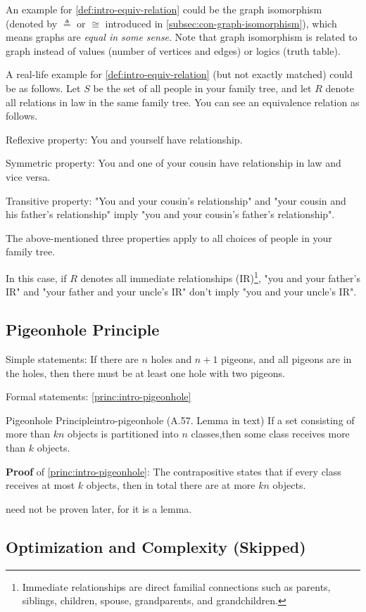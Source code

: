 \documentclass[../src/handouts/main.tex]{subfiles}
\begin{document}
An example for \cref{def:intro-equiv-relation} could be the graph isomorphism (denoted by $\triangleq$ or $\cong$ introduced in \cref{subsec:con-graph-isomorphism}), which means graphs are \textit{equal in some sense}. Note that graph isomorphism is related to graph instead of values (number of vertices and edges) or logics (truth table).

A real-life example for \cref{def:intro-equiv-relation} (but not exactly matched) could be as follows. Let $S$ be the set of all people in your family tree, and let $R$ denote all relations in law in the same family tree. You can see an equivalence relation as follows.
\begin{enumerate*}
  \item Reflexive property: You and yourself have relationship.
  \item Symmetric property: You and one of your cousin have relationship in law and vice versa.
  \item Transitive property: "You and your cousin's relationship" and "your cousin and his father's relationship" imply "you and your cousin's father's relationship".
  \item The above-mentioned three properties apply to all choices of people in your family tree.
\end{enumerate*}
In this case, if $R$ denotes all immediate relationships (IR)\footnote{Immediate relationships are direct familial connections such as parents, siblings, children, spouse, grandparents, and grandchildren.}, "you and your father's IR" and "your father and your uncle's IR" don't imply "you and your uncle's IR".

\subsection{Pigeonhole Principle}

Simple statements: If there are $n$ holes and $n + 1$ pigeons, and all pigeons are in the holes, then there must be at least one hole with two pigeons.

Formal statements: \cref{princ:intro-pigeonhole}

\begin{principle}{Pigeonhole Principle}{intro-pigeonhole}
  (A.57. Lemma in text)
  If a set consisting of more than $kn$ objects is partitioned into $n$ classes,then some class receives more than $k$ objects.
\end{principle}

\textbf{Proof} of \cref{princ:intro-pigeonhole}: The contrapositive states that if every class receives at most $k$ objects, then in total there are at more $kn$ objects.

 need not be proven later, for it is a lemma.

\subsection{Optimization and Complexity (Skipped)}
\end{document}
